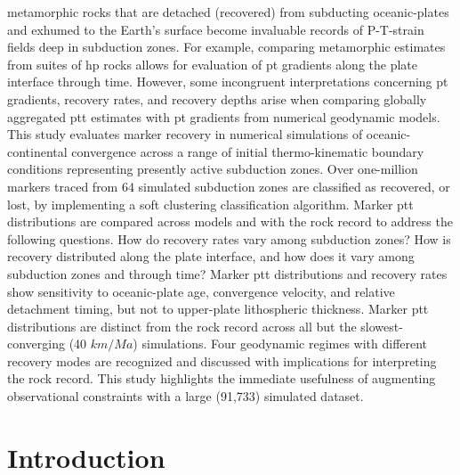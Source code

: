  metamorphic rocks that are detached (recovered) from subducting oceanic-plates and exhumed to the Earth's surface become invaluable records of P-T-strain fields deep in subduction zones. For example, comparing metamorphic  estimates from suites of \gls{hp} rocks allows for evaluation of \gls{pt} gradients along the plate interface through time. However, some incongruent interpretations concerning \gls{pt} gradients, recovery rates, and recovery depths arise when comparing globally aggregated \gls{ptt} estimates with \gls{pt} gradients from numerical geodynamic models. This study evaluates marker recovery in numerical simulations of oceanic-continental convergence across a range of initial thermo-kinematic boundary conditions representing presently active subduction zones. Over one-million markers traced from 64 simulated subduction zones are classified as recovered, or lost, by implementing a soft clustering classification algorithm. Marker \gls{ptt} distributions are compared across models and with the rock record to address the following questions. How do recovery rates vary among subduction zones? How is recovery distributed along the plate interface, and how does it vary among subduction zones and through time? Marker \gls{ptt} distributions and recovery rates show sensitivity to oceanic-plate age, convergence velocity, and relative detachment timing, but not to upper-plate lithospheric thickness. Marker \gls{ptt} distributions are distinct from the rock record across all but the slowest-converging (40 \(km/Ma\)) simulations. Four geodynamic regimes with different recovery modes are recognized and discussed with implications for interpreting the rock record. This study highlights the immediate usefulness of augmenting observational constraints with a large (91,733) simulated dataset.

\hypertarget{chpt4Intro}{%
\section{Introduction}\label{chpt4Intro}}

